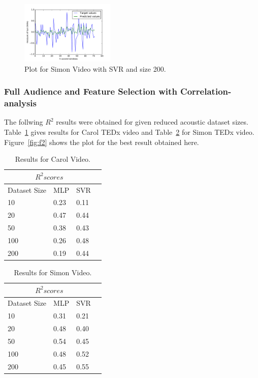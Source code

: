 \begin{figure}
\centering
\includegraphics[width=0.4\textwidth]{f1.pdf}
\caption{\label{fig:f1}Plot for Simon Video with SVR and size 200.}
\end{figure} 

\subsubsection{Full Audience and Feature Selection with Correlation-analysis}

The follwing $R^2$ results were obtained for given reduced acoustic dataset sizes. Table~\ref{tab:carol2} gives results for Carol TEDx video and Table~\ref{tab:simon2} for Simon TEDx video. Figure~\ref{fig:f2} shows the plot for the best result obtained here.

\begin{table}
\centering
\begin{tabular}{ |p{3cm}||p{3cm}|p{3cm}|p{3cm}|  }
 \hline
 \multicolumn{3}{|c|}{$R^2 scores$} \\
 \hline
 Dataset Size &MLP &SVR\\
 \hline
 10 & 0.23 & 0.11\\
 20 & 0.47 & 0.44\\
 50 & 0.38 & 0.43\\
 100 & 0.26 & 0.48\\
 200 & 0.19 & 0.44\\
 \hline
\end{tabular}
\caption{\label{tab:carol2}Results for Carol Video.}
\end{table}

\begin{table}
\centering
\begin{tabular}{ |p{3cm}||p{3cm}|p{3cm}|p{3cm}|  }
 \hline
 \multicolumn{3}{|c|}{$R^2 scores$} \\
 \hline
 Dataset Size &MLP &SVR\\
 \hline
 10 & 0.31 & 0.21\\
 20 & 0.48 & 0.40\\
 50 & 0.54 & 0.45\\
 100 & 0.48 & 0.52\\
 200 & 0.45 & 0.55\\
 \hline
\end{tabular}
\caption{\label{tab:simon2}Results for Simon Video.}
\end{table}

